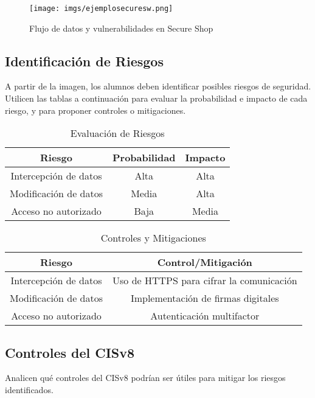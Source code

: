 \begin{figure}[h]
\centering
\texttt{[image: imgs/ejemplosecuresw.png]}
\caption{Flujo de datos y vulnerabilidades en Secure Shop}
\label{fig:ejemplosecuresw}
\end{figure}

\subsection{Identificación de Riesgos}
A partir de la imagen, los alumnos deben identificar posibles riesgos de seguridad. Utilicen las tablas a continuación para evaluar la probabilidad e impacto de cada riesgo, y para proponer controles o mitigaciones.

\begin{table}[h]
\centering
\begin{tabular}{|c|c|c|}
\hline
\textbf{Riesgo} & \textbf{Probabilidad} & \textbf{Impacto} \\
\hline
Intercepción de datos & Alta & Alta \\
\hline
Modificación de datos & Media & Alta \\
\hline
Acceso no autorizado & Baja & Media \\
\hline
\end{tabular}
\caption{Evaluación de Riesgos}
\end{table}

\begin{table}[h]
\centering
\begin{tabular}{|c|c|}
\hline
\textbf{Riesgo} & \textbf{Control/Mitigación} \\
\hline
Intercepción de datos & Uso de HTTPS para cifrar la comunicación \\
\hline
Modificación de datos & Implementación de firmas digitales \\
\hline
Acceso no autorizado & Autenticación multifactor \\
\hline
\end{tabular}
\caption{Controles y Mitigaciones}
\end{table}

\subsection{Controles del CISv8}
Analicen qué controles del CISv8 podrían ser útiles para mitigar los riesgos identificados.

